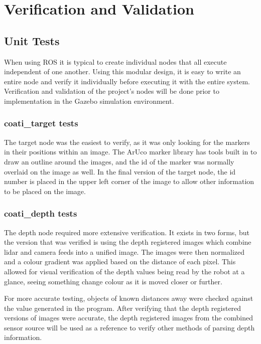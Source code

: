 \documentclass{article}[12]
\begin{document}
\section{Verification and Validation} 
	
		\subsection{Unit Tests}
	
	When using ROS it is typical to create individual nodes that all execute independent of one another. Using this modular design, it is easy to write an entire node and verify it individually before executing it with the entire system. Verification and validation of the project's nodes will be done prior to implementation in the Gazebo simulation environment.
	
	\subsubsection{coati\_target tests}
	
	The target node was the easiest to verify, as it was only looking for the markers in their positions within an image. The ArUco marker library has tools built in to draw an outline around the images, and the id of the marker was normally overlaid on the image as well. In the final version of the target node, the id number is placed in the upper left corner of the image to allow other information to be placed on the image.
	
	\subsubsection{coati\_depth tests}
	
	The depth node required more extensive verification. It exists in two forms, but the version that was verified is using the depth registered images which combine lidar and camera feeds into a unified image. The images were then normalized and a colour gradient was applied based on the distance of each pixel. This allowed for visual verification of the depth values being read by the robot at a glance, seeing something change colour as it is moved closer or further.
	
	For more accurate testing, objects of known distances away were checked against the value generated in the program. After verifying that the depth registered versions of images were accurate, the depth registered images from the combined sensor source will be used as a reference to verify other methods of parsing depth information.
	
\end{document}
